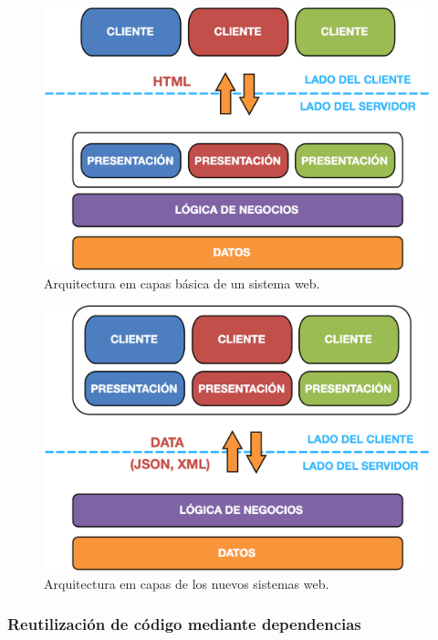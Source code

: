 \begin{figure}[t]
	\centering
	\includegraphics[]{figures/web_arch.png}
	\caption{Arquitectura em capas básica de un sistema web.}
	\label{fig:intro:jvm:web_arch}
\end{figure}

\begin{figure}[t]
	\centering
	\includegraphics[]{figures/new_web_arch.png}
	\caption{Arquitectura em capas de los nuevos sistemas web.}
	\label{fig:intro:jvm:new_web_arch}
\end{figure}

 
\subsubsection{Reutilización de código mediante dependencias}
\label{susubbsec:intro:jvm_dev:dependencies}

